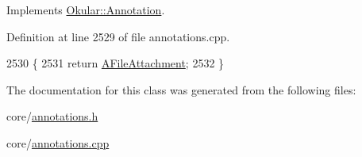 Implements \hyperlink{classOkular_1_1Annotation_af9833449767eacd740f377e69a1fdd48}{Okular\+::\+Annotation}.



Definition at line 2529 of file annotations.\+cpp.


\begin{DoxyCode}
2530 \{
2531     \textcolor{keywordflow}{return} \hyperlink{classOkular_1_1Annotation_af71b46e37d5f850b97d5c4de3be9aac0a7209cbfb5e13c0f80ac36f87c9575836}{AFileAttachment};
2532 \}
\end{DoxyCode}


The documentation for this class was generated from the following files\+:\begin{DoxyCompactItemize}
\item 
core/\hyperlink{annotations_8h}{annotations.\+h}\item 
core/\hyperlink{annotations_8cpp}{annotations.\+cpp}\end{DoxyCompactItemize}
